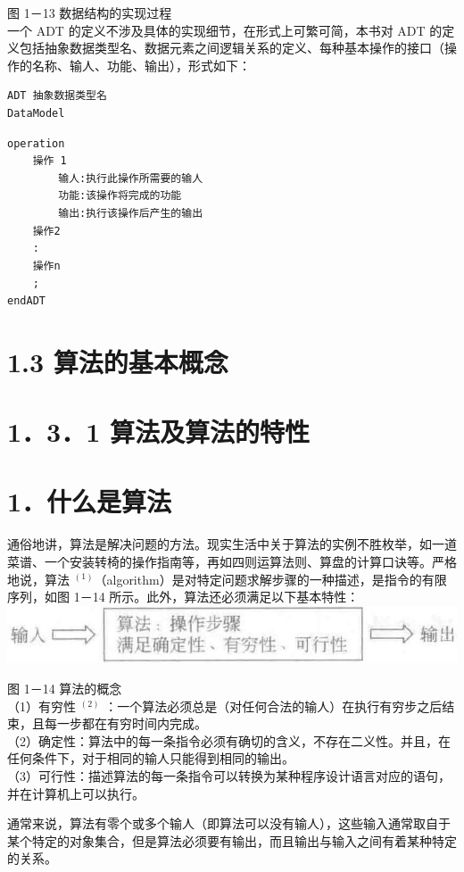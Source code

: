 \documentclass[10pt]{article}
\begin{document}
图 1－13 数据结构的实现过程\\
一个 ADT 的定义不涉及具体的实现细节，在形式上可繁可简，本书对 ADT 的定义包括抽象数据类型名、数据元素之间逻辑关系的定义、每种基本操作的接口（操作的名称、输人、功能、输出），形式如下：

\begin{verbatim}
ADT 抽象数据类型名
DataModel
\end{verbatim}

\begin{verbatim}
operation
    操作 1
        输人:执行此操作所需要的输人
        功能:该操作将完成的功能
        输出:执行该操作后产生的输出
    操作2
    :
    操作n
    ;
endADT
\end{verbatim}

\section*{1.3 算法的基本概念}
\section*{1．3．1 算法及算法的特性}
\section*{1．什么是算法}
通俗地讲，算法是解决问题的方法。现实生活中关于算法的实例不胜枚举，如一道菜谱、一个安装转椅的操作指南等，再如四则运算法则、算盘的计算口诀等。严格地说，算法 ${ }^{(1)}$（algorithm）是对特定问题求解步骤的一种描述，是指令的有限序列，如图 1－14 所示。此外，算法还必须满足以下基本特性：\\
\includegraphics[max width=\textwidth, center]{2025_06_06_704745ea57b15b2333e5g-026}

图 1－14 算法的概念\\
（1）有穷性 ${ }^{(2)}$ ：一个算法必须总是（对任何合法的输人）在执行有穷步之后结束，且每一步都在有穷时间内完成。\\
（2）确定性：算法中的每一条指令必须有确切的含义，不存在二义性。并且，在任何条件下，对于相同的输人只能得到相同的输出。\\
（3）可行性：描述算法的每一条指令可以转换为某种程序设计语言对应的语句，并在计算机上可以执行。

通常来说，算法有零个或多个输人（即算法可以没有输人），这些输入通常取自于某个特定的对象集合，但是算法必须要有输出，而且输出与输入之间有着某种特定的关系。
\end{document}
